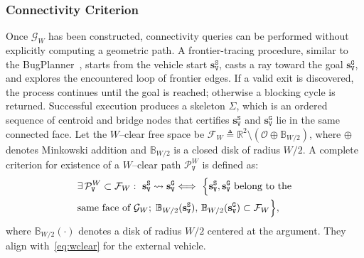 \subsubsection{Connectivity Criterion}\label{subsubsec:bugplanner}
Once $\mathcal{G}_W$ has been constructed, connectivity queries can be
performed without explicitly computing a geometric path. A frontier-tracing
procedure, similar to the BugPlanner~\cite{McGuireCroonTuyls2019}, starts from the vehicle start
$\mathbf{s}_\texttt{V}^{\texttt{S}}$, casts a ray toward the goal
$\mathbf{s}_\texttt{V}^{\texttt{G}}$, and explores the encountered loop of
frontier edges. If a valid exit is discovered, the process continues until the
goal is reached; otherwise a blocking cycle is returned. Successful execution
produces a skeleton $\Sigma$, which is an ordered sequence of centroid and
bridge nodes that certifies $\mathbf{s}_\texttt{V}^{\texttt{S}}$ and
$\mathbf{s}_\texttt{V}^{\texttt{G}}$ lie in the same connected face.
Let the $W$--clear free space be
$\mathcal{F}_W\triangleq\mathbb{R}^2\setminus(\mathcal{O}\oplus\mathbb{B}_{W/2})$,
where $\oplus$ denotes Minkowski addition and $\mathbb{B}_{W/2}$ is a closed
disk of radius $W/2$. A complete criterion for existence of a $W$--clear path
$\mathcal{P}^W_\texttt{V}$ is defined as:
\begin{equation}\label{eq:wccg_criterion}
\begin{aligned}
&\exists\,\mathcal{P}^W_\texttt{V}\subset\mathcal{F}_W:\
  \mathbf{s}_\texttt{V}^{\texttt{S}}\leadsto\mathbf{s}_\texttt{V}^{\texttt{G}} \Longleftrightarrow\
  \Big{\{}\mathbf{s}_\texttt{V}^{\texttt{S}},\mathbf{s}_\texttt{V}^{\texttt{G}}
  \ \text{belong to the} \\
  & \text{same face of }\mathcal{G}_W; \;\mathbb{B}_{W/2}(\mathbf{s}_\texttt{V}^{\texttt{S}}),
  \,\mathbb{B}_{W/2}(\mathbf{s}_\texttt{V}^{\texttt{G}})\subset\mathcal{F}_W\Big{\}},
\end{aligned}
\end{equation}
where $\mathbb{B}_{W/2}(\cdot)$ denotes a disk of radius $W/2$ centered at the
argument. They align with~\eqref{eq:wclear} for the external vehicle.

